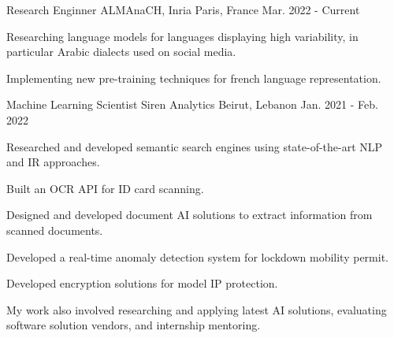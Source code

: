 

\begin{cventries}
  \cventry
    {Research Enginner} %
    {ALMAnaCH, Inria} %
    {Paris, France} %
    {Mar. 2022 - Current} %
    { 
      \begin{cvitems} %
        \item {Researching language models for languages displaying high variability, in particular Arabic dialects used on social media.}
        \item {Implementing new pre-training techniques for french language representation.}
      \end{cvitems}
    }
  \cventry
    {Machine Learning Scientist} %
    {Siren Analytics} %
    {Beirut, Lebanon} %
    {Jan. 2021 - Feb. 2022} %
    { 
      \begin{cvitems} %
        \item {Researched and developed semantic search engines using state-of-the-art NLP and IR approaches.}
        \item {Built an OCR API for ID card scanning.}
        \item {Designed and developed document AI solutions to extract information from scanned documents.}
        \item {Developed a real-time anomaly detection system for lockdown mobility permit.}
        \item {Developed encryption solutions for model IP protection.}
        \item {My work also involved researching and applying latest AI solutions, evaluating software solution vendors, and internship mentoring.}
      \end{cvitems}
    }


\end{cventries}

